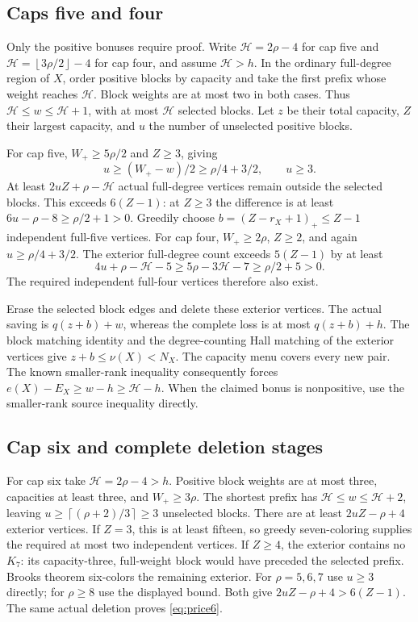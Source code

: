 \documentclass[11pt,a4paper]{article}
\newcommand{\floor}[1]{\left\lfloor#1\right\rfloor}
\newcommand{\ceil}[1]{\left\lceil#1\right\rceil}
\theoremstyle{definition}
\begin{document}
\subsection{Caps five and four}
Only the positive bonuses require proof. Write $\mathcal H=2\rho-4$ for cap five and $\mathcal H=\floor{3\rho/2}-4$ for cap four, and assume $\mathcal H>h$. In the ordinary full-degree region of $X$, order positive blocks by capacity and take the first prefix whose weight reaches $\mathcal H$. Block weights are at most two in both cases. Thus $\mathcal H\le w\le\mathcal H+1$, with at most $\mathcal H$ selected blocks. Let $z$ be their total capacity, $Z$ their largest capacity, and $u$ the number of unselected positive blocks.

For cap five, $W_+\ge5\rho/2$ and $Z\ge3$, giving
\[
 u\ge(W_+-w)/2\ge\rho/4+3/2,\qquad u\ge3.
\]
At least $2uZ+\rho-\mathcal H$ actual full-degree vertices remain outside the selected blocks. This exceeds $6(Z-1)$: at $Z\ge3$ the difference is at least $6u-\rho-8\ge\rho/2+1>0$. Greedily choose $b=(Z-r_X+1)_+\le Z-1$ independent full-five vertices. For cap four, $W_+\ge2\rho$, $Z\ge2$, and again $u\ge\rho/4+3/2$. The exterior full-degree count exceeds $5(Z-1)$ by at least
\[
 4u+\rho-\mathcal H-5
 \ge5\rho-3\mathcal H-7\ge\rho/2+5>0.
\]
The required independent full-four vertices therefore also exist.

Erase the selected block edges and delete these exterior vertices. The actual saving is $q(z+b)+w$, whereas the complete loss is at most $q(z+b)+h$. The block matching identity and the degree-counting Hall matching of the exterior vertices give $z+b\le\nu(X)<N_X$. The capacity menu covers every new pair. The known smaller-rank inequality consequently forces $e(X)-E_X\ge w-h\ge\mathcal H-h$. When the claimed bonus is nonpositive, use the smaller-rank source inequality directly.

\subsection{Cap six and complete deletion stages}
For cap six take $\mathcal H=2\rho-4>h$. Positive block weights are at most three, capacities at least three, and $W_+\ge3\rho$. The shortest prefix has $\mathcal H\le w\le\mathcal H+2$, leaving
$u\ge\ceil{(\rho+2)/3}\ge3$ unselected blocks. There are at least $2uZ-\rho+4$ exterior vertices. If $Z=3$, this is at least fifteen, so greedy seven-coloring supplies the required at most two independent vertices. If $Z\ge4$, the exterior contains no $K_7$: its capacity-three, full-weight block would have preceded the selected prefix. Brooks theorem six-colors the remaining exterior. For $\rho=5,6,7$ use $u\ge3$ directly; for $\rho\ge8$ use the displayed bound. Both give $2uZ-\rho+4>6(Z-1)$. The same actual deletion proves \eqref{eq:price6}.
\end{document}

